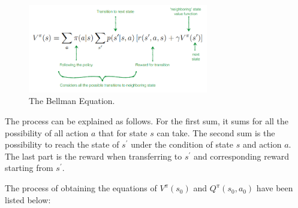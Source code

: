 \documentclass[11pt]{article}
\begin{document}
\begin{figure}[H]
\centering
    \includegraphics[width=0.7\textwidth]{BE.png}
    \caption{The Bellman Equation.}
	\label{fig:process}
\end{figure}
The process can be explained as follows. For the first sum, it sums for all the possibility of all action $a$ that for state $s$ can take. The second sum is the possibility to reach the state of $s^{'}$ under the condition of state $s$ and action $a$. The last part is the reward when transferring to $s^{'}$ and corresponding reward starting from $s^{'}$.

The process of obtaining the equations of $V^{\pi}(s_0)$ and $Q^{\pi}(s_0, a_0)$ have been listed below: 
\end{document}
